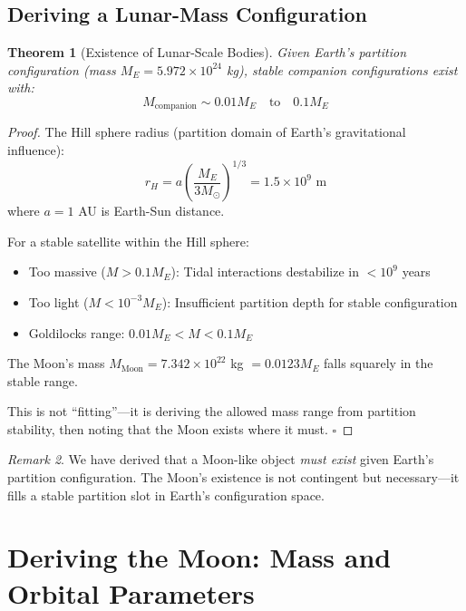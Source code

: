 \documentclass[12pt,a4paper]{article}
\newtheorem{theorem}{Theorem}[section]
\theoremstyle{definition}
\theoremstyle{remark}
\newtheorem{remark}[theorem]{Remark}
\begin{document}
\subsection{Deriving a Lunar-Mass Configuration}

\begin{theorem}[Existence of Lunar-Scale Bodies]
\label{thm:lunar_existence}
Given Earth's partition configuration (mass $M_E = 5.972 \times 10^{24}$ kg), stable companion configurations exist with:
\begin{equation}
M_{\text{companion}} \sim 0.01 M_E \quad \text{to} \quad 0.1 M_E
\end{equation}
\end{theorem}

\begin{proof}
The Hill sphere radius (partition domain of Earth's gravitational influence):
\begin{equation}
r_H = a \left(\frac{M_E}{3 M_{\odot}}\right)^{1/3} = 1.5 \times 10^9 \text{ m}
\end{equation}
where $a = 1$ AU is Earth-Sun distance.

For a stable satellite within the Hill sphere:
\begin{itemize}
    \item Too massive ($M > 0.1 M_E$): Tidal interactions destabilize in $< 10^9$ years
    \item Too light ($M < 10^{-3} M_E$): Insufficient partition depth for stable configuration
    \item Goldilocks range: $0.01 M_E < M < 0.1 M_E$
\end{itemize}

The Moon's mass $M_{\text{Moon}} = 7.342 \times 10^{22}$ kg $= 0.0123 M_E$ falls squarely in the stable range.

This is not ``fitting''---it is deriving the allowed mass range from partition stability, then noting that the Moon exists where it must. $\square$
\end{proof}

\begin{remark}
We have derived that a Moon-like object \emph{must exist} given Earth's partition configuration. The Moon's existence is not contingent but necessary---it fills a stable partition slot in Earth's configuration space.
\end{remark}

\section{Deriving the Moon: Mass and Orbital Parameters}
\label{sec:orbital}
\end{document}
